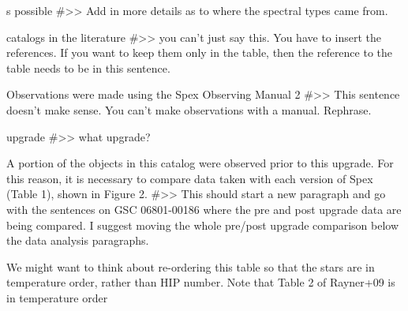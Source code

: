 



s possible
#>> Add in more details as to where the spectral types came from.

 catalogs in the literature
 #>> you can't just say this. You have to insert the references. If you want to keep them only in the table, then the reference to the table needs to be in this sentence.






Observations were made using the Spex Observing Manual 2
#>> This sentence doesn't make sense. You can't make observations with a manual. Rephrase.

upgrade
#>> what upgrade?


A portion of the objects in this catalog were observed prior to this upgrade. For this reason, it is necessary to compare data taken with each version of Spex (Table 1), shown in Figure 2.
#>> This should start a new paragraph and go with the sentences on GSC 06801-00186 where the pre and post upgrade data are being compared. I suggest moving the whole pre/post upgrade comparison below the data analysis paragraphs.




We might want to think about re-ordering this table so that the stars are in temperature order, rather than HIP number. Note that Table 2 of Rayner+09 is in temperature order


